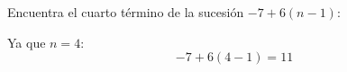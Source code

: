 Encuentra el cuarto término de la sucesión $-7+6(n-1)$:

\begin{solutionbox}{1.6cm}
    Ya que $n=4$:
    \[-7+6(4-1)=11\]
\end{solutionbox}
